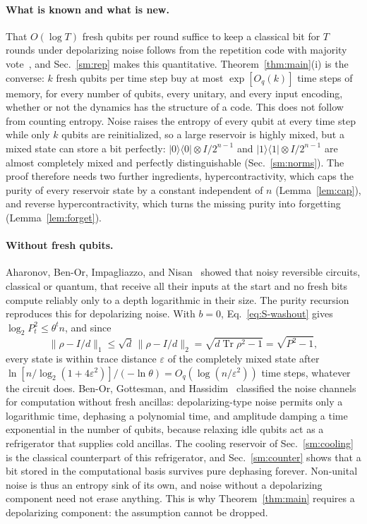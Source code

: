 \documentclass[aps,prl,twocolumn,superscriptaddress,floatfix]{revtex4-2}
\theoremstyle{plain}
\newcommand{\tr}{\operatorname{Tr}}
\newcommand{\ketbra}[2]{|#1\rangle\!\langle #2|}
\newcommand{\Norm}[1]{\lVert #1\rVert}
\begin{document}
\paragraph*{What is known and what is new.} That $O(\log T)$ fresh qubits per round suffice to keep a classical bit for $T$ rounds under depolarizing noise follows from the repetition code with majority vote~\cite{vonNeumann1956}, and Sec.~\ref{sm:rep} makes this quantitative. Theorem~\ref{thm:main}(i) is the converse: $k$ fresh qubits per time step buy at most $\exp[O_q(k)]$ time steps of memory, for every number of qubits, every unitary, and every input encoding, whether or not the dynamics has the structure of a code. This does not follow from counting entropy. Noise raises the entropy of every qubit at every time step while only $k$ qubits are reinitialized, so a large reservoir is highly mixed, but a mixed state can store a bit perfectly: $\ketbra00\otimes I/2^{n-1}$ and $\ketbra11\otimes I/2^{n-1}$ are almost completely mixed and perfectly distinguishable (Sec.~\ref{sm:norms}). The proof therefore needs two further ingredients, hypercontractivity, which caps the purity of every reservoir state by a constant independent of $n$ (Lemma~\ref{lem:cap}), and reverse hypercontractivity, which turns the missing purity into forgetting (Lemma~\ref{lem:forget}).

\paragraph*{Without fresh qubits.} Aharonov, Ben-Or, Impagliazzo, and Nisan~\cite{Aharonov1996} showed that noisy reversible circuits, classical or quantum, that receive all their inputs at the start and no fresh bits compute reliably only to a depth logarithmic in their size. The purity recursion reproduces this for depolarizing noise. With $b=0$, Eq.~\eqref{eq:S-washout} gives $\log_2P_t^2\le\theta^tn$, and since
\[
\Norm{\rho-I/d}_1\le\sqrt d\,\Norm{\rho-I/d}_2=\sqrt{d\tr\rho^2-1}=\sqrt{P^2-1},
\]
every state is within trace distance $\varepsilon$ of the completely mixed state after $\ln[n/\log_2(1+4\varepsilon^2)]/(-\ln\theta)=O_q(\log(n/\varepsilon^2))$ time steps, whatever the circuit does. Ben-Or, Gottesman, and Hassidim~\cite{BenOr2013} classified the noise channels for computation without fresh ancillas: depolarizing-type noise permits only a logarithmic time, dephasing a polynomial time, and amplitude damping a time exponential in the number of qubits, because relaxing idle qubits act as a refrigerator that supplies cold ancillas. The cooling reservoir of Sec.~\ref{sm:cooling} is the classical counterpart of this refrigerator, and Sec.~\ref{sm:counter} shows that a bit stored in the computational basis survives pure dephasing forever. Non-unital noise is thus an entropy sink of its own, and noise without a depolarizing component need not erase anything. This is why Theorem~\ref{thm:main} requires a depolarizing component: the assumption cannot be dropped.
\end{document}
